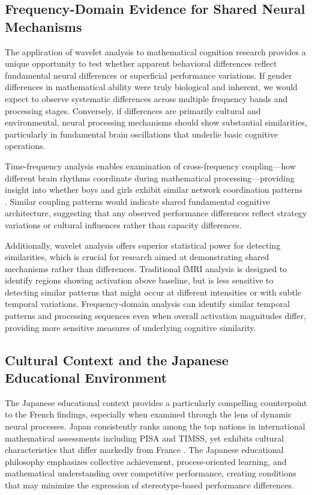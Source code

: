 \documentclass[pdflatex,reference]{sn-jnl}%
\theoremstyle{thmstyleone}%
\theoremstyle{thmstyletwo}%
\theoremstyle{thmstylethree}%
\begin{document}
\subsection{Frequency-Domain Evidence for Shared Neural Mechanisms}
The application of wavelet analysis to mathematical cognition research provides a unique opportunity to test whether apparent behavioral differences reflect fundamental neural differences or superficial performance variations. If gender differences in mathematical ability were truly biological and inherent, we would expect to observe systematic differences across multiple frequency bands and processing stages. Conversely, if differences are primarily cultural and environmental, neural processing mechanisms should show substantial similarities, particularly in fundamental brain oscillations that underlie basic cognitive operations.

Time-frequency analysis enables examination of cross-frequency coupling—how different brain rhythms coordinate during mathematical processing—providing insight into whether boys and girls exhibit similar network coordination patterns \cite{canolty2006high,varela2001brainweb}. Similar coupling patterns would indicate shared fundamental cognitive architecture, suggesting that any observed performance differences reflect strategy variations or cultural influences rather than capacity differences.

Additionally, wavelet analysis offers superior statistical power for detecting similarities, which is crucial for research aimed at demonstrating shared mechanisms rather than differences. Traditional fMRI analysis is designed to identify regions showing activation above baseline, but is less sensitive to detecting similar patterns that might occur at different intensities or with subtle temporal variations. Frequency-domain analysis can identify similar temporal patterns and processing sequences even when overall activation magnitudes differ, providing more sensitive measures of underlying cognitive similarity.


\subsection{Cultural Context and the Japanese Educational Environment}
The Japanese educational context provides a particularly compelling counterpoint to the French findings, especially when examined through the lens of dynamic neural processes. Japan consistently ranks among the top nations in international mathematical assessments including PISA and TIMSS, yet exhibits cultural characteristics that differ markedly from France \cite{mullis2020timss}. The Japanese educational philosophy emphasizes collective achievement, process-oriented learning, and mathematical understanding over competitive performance, creating conditions that may minimize the expression of stereotype-based performance differences.
\end{document}

